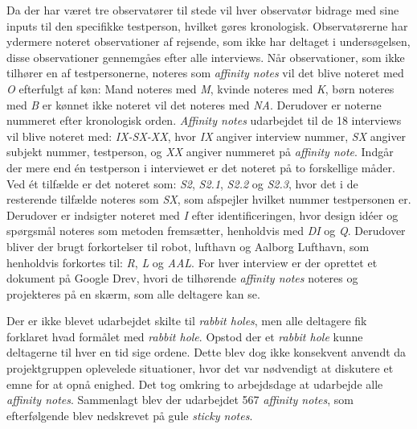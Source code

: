 Da der har været tre observatører til stede vil hver observatør bidrage med sine inputs til den specifikke testperson, hvilket gøres kronologisk. Observatørerne har ydermere noteret observationer af rejsende, som ikke har deltaget i undersøgelsen, disse observationer gennemgåes efter alle interviews. Når observationer, som ikke tilhører en af testpersonerne, noteres som \textit{affinity notes} vil det blive noteret med \textit{O} efterfulgt af køn: Mand noteres med \textit{M}, kvinde noteres med \textit{K}, børn noteres med \textit{B} er kønnet ikke noteret vil det noteres med \textit{NA}. Derudover er noterne nummeret efter kronologisk orden. \textit{Affinity notes} udarbejdet til de 18 interviews vil blive noteret med: \textit{IX-SX-XX}, hvor \textit{IX} angiver interview nummer, \textit{SX} angiver subjekt nummer, testperson, og \textit{XX} angiver nummeret på \textit{affinity note}. Indgår der mere end én testperson i interviewet er det noteret på to forskellige måder. Ved ét tilfælde er det noteret som: \textit{S2}, \textit{S2.1}, \textit{S2.2} og \textit{S2.3}, hvor det i de resterende tilfælde noteres som \textit{SX}, som afspejler hvilket nummer testpersonen er. Derudover er indsigter noteret med \textit{I} efter identificeringen, hvor design idéer og spørgsmål noteres som metoden fremsætter, henholdvis med \textit{DI} og \textit{Q}. Derudover bliver der brugt forkortelser til robot, lufthavn og Aalborg Lufthavn, som henholdvis forkortes til: \textit{R}, \textit{L} og \textit{AAL}. For hver interview er der oprettet et dokument på Google Drev, hvori de tilhørende \textit{affinity notes} noteres og projekteres på en skærm, som alle deltagere kan se. 

Der er ikke blevet udarbejdet skilte til \textit{rabbit holes}, men alle deltagere fik forklaret hvad formålet med \textit{rabbit hole}. Opstod der et \textit{rabbit hole} kunne deltagerne til hver en tid sige ordene. Dette blev dog ikke konsekvent anvendt da projektgruppen oplevelede situationer, hvor det var nødvendigt at diskutere et emne for at opnå enighed. Det tog omkring to arbejdsdage at udarbejde alle \textit{affinity notes}. Sammenlagt blev der udarbejdet 567 \textit{affinity notes}, som efterfølgende blev nedskrevet på gule \textit{sticky notes}.   



